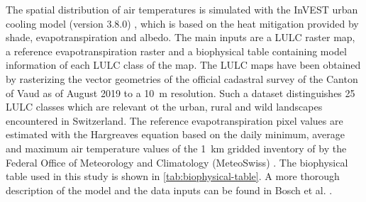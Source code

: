 \documentclass[10pt,letterpaper]{article}
\begin{document}
The spatial distribution of air temperatures is simulated with the InVEST urban cooling model (version 3.8.0) \cite{sharp2020invest}, which is based on the heat mitigation provided by shade, evapotranspiration and albedo.
The main inputs are a LULC raster map, a reference evapotranspiration raster and a biophysical table containing model information of each LULC class of the map.
The LULC maps have been obtained by rasterizing the vector geometries of the official cadastral survey of the Canton of Vaud \cite{asitvd2018structure} as of August 2019 to a 10~m resolution. Such a dataset distinguishes 25 LULC classes which are relevant ot the urban, rural and wild landscapes encountered in Switzerland.
The reference evapotranspiration pixel values are estimated with the Hargreaves equation \cite{hargreaves1985reference} based on the daily minimum, average and maximum air temperature values of the 1~km gridded inventory of by the Federal Office of Meteorology and Climatology (MeteoSwiss) \cite{frei2014interpolation}.
The biophysical table used in this study is shown in \autoref{tab:biophysical-table}.
A more thorough description of the model and the data inputs can be found in Bosch et al. \cite{bosch2020spatially}.
\end{document}
